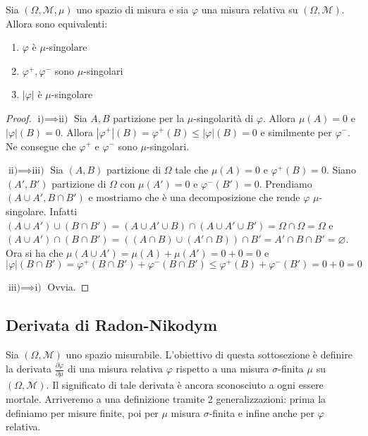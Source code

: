 \begin{proposition}\label{prop:equivalenti_sing}
    Sia \((\Omega, \mathcal{M}, \mu)\) uno spazio di misura e sia \(\varphi \)
    una misura relativa su \((\Omega, \mathcal{M})\). Allora sono equivalenti:
    \begin{enumerate}[label = \roman*)]
        \item \(\varphi \) è \(\mu\)-singolare
        \item \(\varphi^{+}, \varphi^{-}\) sono \(\mu\)-singolari
        \item \(|\varphi|\) è \(\mu\)-singolare
    \end{enumerate}
\end{proposition}
\begin{proof}
    \(\text{i)} \implies \text{ii)}\) Sia \(A, B\) partizione per la
    \(\mu\)-singolarità di \(\varphi \). Allora \(\mu(A) = 0\) e \(|\varphi|(B)
    = 0\). Allora \(|\varphi ^{+}|(B) = \varphi ^{+}(B) \le |\varphi |(B) = 0\)
    e similmente per \(\varphi^{-}\). Ne consegue che \(\varphi^{+}\) e
    \(\varphi^{-}\) sono \(\mu\)-singolari.

    \(\text{ii)} \implies \text{iii)}\) Sia \((A, B)\) partizione di \(\Omega\)
    tale che \(\mu(A) = 0\) e \(\varphi ^{+}(B) = 0\). Siano \((A', B')\)
    partizione di \(\Omega\) con \(\mu(A') = 0\) e \(\varphi ^{-}(B') = 0\).
    Prendiamo \((A \cup A', B \cap B')\) e mostriamo che è una
    decomposizione che rende \(\varphi \) \(\mu\)-singolare. Infatti 
    \((A \cup A') \cup (B \cap B') = (A \cup A' \cup B) \cap (A \cup A' \cup B')
    = \Omega \cap \Omega = \Omega\) e \((A \cup A') \cap (B \cap B') = ((A \cap
    B) \cup (A' \cap B)) \cap B' = A' \cap B \cap B' = \varnothing \). Ora si ha
    che \(\mu(A \cup A') = \mu(A) + \mu(A') = 0 + 0 = 0\) e \(|\varphi |(B \cap
    B') = \varphi ^{+}(B \cap B') + \varphi ^{-} (B \cap B') \le \varphi ^{+}
    (B) + \varphi ^{-} (B') = 0+0 = 0\) 

    \(\text{iii)} \implies \text{i)}\) Ovvia.
\end{proof}

\subsection{Derivata di Radon-Nikodym}
Sia \({(\Omega, \mathcal{M})}\) uno spazio misurabile. L'obiettivo di questa
sottosezione è definire la derivata \(\frac{\partial \varphi }{\partial \mu}\)
di una misura relativa \(\varphi \) rispetto a una misura \(\sigma\)-finita
\(\mu\) su \((\Omega, \mathcal{M})\). Il significato di tale derivata è ancora
sconosciuto a ogni essere mortale. Arriveremo a una definizione tramite 2
generalizzazioni: prima la definiamo per misure finite, poi per \(\mu\) misura
\(\sigma\)-finita e infine anche per \(\varphi \) relativa.


